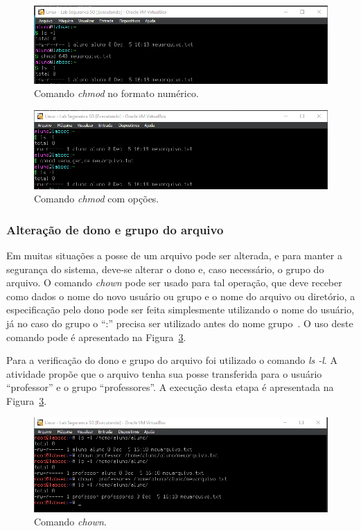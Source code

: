 \documentclass[
    12pt,				%
    oneside,   	        %
    a4paper,			%
    english,			%
    french,				%
    spanish,			%
    brazil,				%
    ]{pacotes/abntex2}
\begin{document}
\begin{figure}[H]
  \centering
  \includegraphics[scale=0.7]{figuras/chmod_num.png}
  \caption{Comando \textit{chmod} no formato numérico.}
  \label{fig:chmod_num}
\end{figure}

\begin{figure}[H]
  \centering
  \includegraphics[scale=0.7]{figuras/chmod_ugoa.png}
  \caption{Comando \textit{chmod} com opções.}
  \label{fig:chmod_ugoa}
\end{figure}

\subsubsection{Alteração de dono e grupo do arquivo}
Em muitas situações a posse de um arquivo pode ser alterada, e para manter a segurança do sistema, deve-se alterar o dono e, caso necessário, o grupo do arquivo. O comando \textit{chown} pode ser usado para tal operação, que deve receber como dados o nome do novo usuário ou grupo e o nome do arquivo ou diretório, a especificação pelo dono pode ser feita simplesmente utilizando o nome do usuário, já no caso do grupo o ``:'' precisa ser utilizado antes do nome grupo~\cite{negus2012}. O uso deste comando pode é apresentado na Figura~\ref{fig:chown}.

Para a verificação do dono e grupo do arquivo foi utilizado o comando \textit{ls -l}. A atividade propõe que o arquivo tenha sua posse transferida para o usuário ``professor'' e o grupo ``professores''. A execução desta etapa é apresentada na Figura~\ref{fig:chown}.

\begin{figure}[H]
  \centering
  \includegraphics[scale=0.7]{figuras/chown.png}
  \caption{Comando \textit{chown}.}
  \label{fig:chown}
\end{figure}
\end{document}
